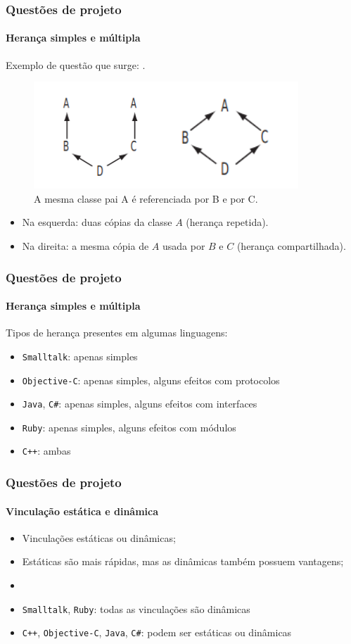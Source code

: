 \begin{frame}
\frametitle{Questões de projeto}
\framesubtitle{Herança simples e múltipla}

Exemplo de questão que surge: .

\begin{figure}
	\centering
	\includegraphics[width=0.7\linewidth]{img/heranca_diamante}
	\caption{A mesma classe pai A é referenciada por B e por C. \cite{louden2012}}
	\label{fig:herancadiamante}
\end{figure}

\begin{itemize}
\item Na esquerda: duas cópias da classe $A$ (herança repetida).
\item Na direita: a mesma cópia de $A$ usada por $B$ e $C$ (herança compartilhada).
\end{itemize}
\end{frame}

\begin{frame}
\frametitle{Questões de projeto}
\framesubtitle{Herança simples e múltipla}
Tipos de herança presentes em algumas linguagens:

\begin{itemize}
	\item \texttt{Smalltalk}: apenas simples
	\item \texttt{Objective-C}: apenas simples, alguns efeitos com protocolos
	\item \texttt{Java}, \texttt{C\#}: apenas simples, alguns efeitos com interfaces
	\item \texttt{Ruby}: apenas simples, alguns efeitos com módulos
	\item \texttt{C++}: ambas
\end{itemize}
\end{frame}

\begin{frame}
\frametitle{Questões de projeto}
\framesubtitle{Vinculação estática e dinâmica}

\begin{itemize}
\item Vinculações estáticas ou dinâmicas;
\item Estáticas são mais rápidas, mas as dinâmicas também possuem vantagens;
\item {}
\item \texttt{Smalltalk}, \texttt{Ruby}: todas as vinculações são dinâmicas
\item \texttt{C++}, \texttt{Objective-C}, \texttt{Java}, \texttt{C\#}: podem ser estáticas ou dinâmicas
\end{itemize}
\end{frame}

